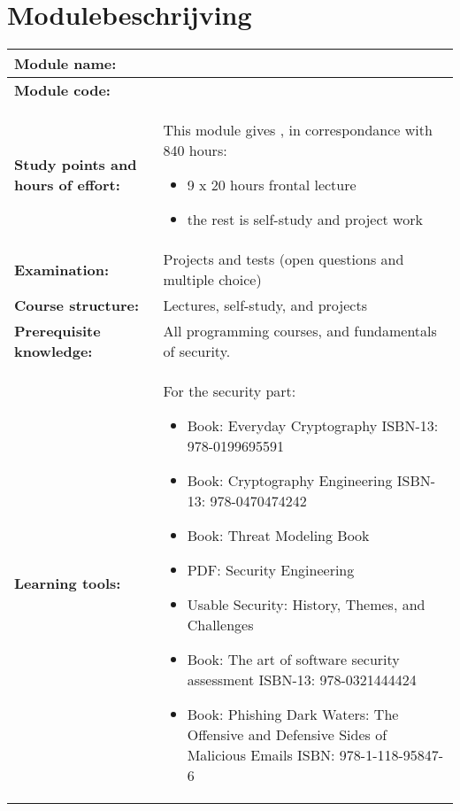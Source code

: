 \section*{Modulebeschrijving}
\begin{tabularx}{\textwidth}{|>{\columncolor{lichtGrijs}} p{}|X|}
	\hline
	\textbf{Module name:} & \modulenaam\\
	\hline
	\textbf{Module code: }& \modulecode\\
	\hline
	\textbf{Study points \newline and hours of effort:} & This module gives \stdPunten, in correspondance with 840 hours:
	\begin{itemize}
		\item 9 x 20 hours frontal lecture
		\item the rest is self-study and project work
	\end{itemize} \\
	\hline
	\textbf{Examination:} & Projects and tests (open questions and multiple choice) \\
	\hline
	\textbf{Course structure:} & Lectures, self-study, and projects \\
	\hline
	\textbf{Prerequisite knowledge:} & All programming courses, and fundamentals of security. \\
	\hline
	\textbf{Learning tools:}  &
		For the security part:
		\begin{itemize}
			\item Book: Everyday Cryptography ISBN-13: 978-0199695591
			\item Book: Cryptography Engineering ISBN-13: 978-0470474242
			\item Book: Threat Modeling Book
			\item PDF: Security Engineering
			\item Usable Security: History, Themes, and Challenges
			\item Book: The art of software security assessment ISBN-13: 978-0321444424
			\item Book: Phishing Dark Waters: The Offensive and Defensive Sides of Malicious Emails ISBN: 978-1-118-95847-6
		\end{itemize}
	

\end{tabularx}
